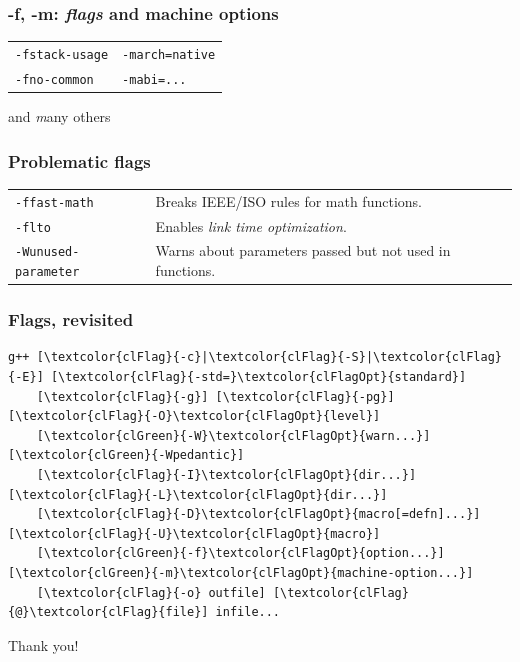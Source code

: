 \documentclass[aspectratio=169]{beamer}
\begin{document}
\begin{frame}
\frametitle{-f, -m: \textit{flags} and machine options}
\begin{table}
\begin{tabular}{l l}
\toprule
\texttt{\textcolor{clGreen}{-f}stack-usage} &
\texttt{\textcolor{clGreen}{-m}arch=native} \\ [3ex]
\texttt{\textcolor{clGreen}{-f}no-common} &
\texttt{\textcolor{clGreen}{-m}abi=...} \\ [3ex]
\bottomrule
\end{tabular}
\end{table}
\begin{center}and {\textit many} others\end{center}
\end{frame}


\begin{frame}
\frametitle{Problematic flags}
\begin{table}
\begin{tabular}{l l}
\toprule
\texttt{\textcolor{clRedFlag}{-ffast-math}} &
Breaks IEEE/ISO rules for math functions.\\ [3ex]
\texttt{\textcolor{clRedFlag}{-flto}} &
Enables \textit{link time optimization}.\\ [3ex]
\texttt{\textcolor{clRedFlag}{-Wunused-parameter}} &
Warns about parameters passed but not used in functions.\\ [3ex]
\bottomrule
\end{tabular}
\end{table}
\end{frame}


\begin{frame}[fragile]
\frametitle{Flags, revisited}

\centering

\begin{BVerbatim}[commandchars=\\\{\}]
g++ [\textcolor{clFlag}{-c}|\textcolor{clFlag}{-S}|\textcolor{clFlag}{-E}] [\textcolor{clFlag}{-std=}\textcolor{clFlagOpt}{standard}]
    [\textcolor{clFlag}{-g}] [\textcolor{clFlag}{-pg}] [\textcolor{clFlag}{-O}\textcolor{clFlagOpt}{level}]
    [\textcolor{clGreen}{-W}\textcolor{clFlagOpt}{warn...}] [\textcolor{clGreen}{-Wpedantic}]
    [\textcolor{clFlag}{-I}\textcolor{clFlagOpt}{dir...}] [\textcolor{clFlag}{-L}\textcolor{clFlagOpt}{dir...}]
    [\textcolor{clFlag}{-D}\textcolor{clFlagOpt}{macro[=defn]...}] [\textcolor{clFlag}{-U}\textcolor{clFlagOpt}{macro}]
    [\textcolor{clGreen}{-f}\textcolor{clFlagOpt}{option...}] [\textcolor{clGreen}{-m}\textcolor{clFlagOpt}{machine-option...}]
    [\textcolor{clFlag}{-o} outfile] [\textcolor{clFlag}{@}\textcolor{clFlag}{file}] infile...
\end{BVerbatim}

\vspace{4.5ex}
\begin{center}
{\huge Thank you!}
\end{center}
\end{frame}
\end{document}
